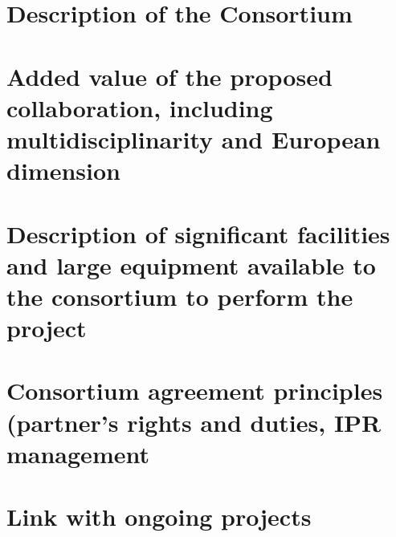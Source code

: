 \documentclass[11pt,twoside,a4paper]{article}
\begin{document}
\section{Description of the Consortium}
\label{sec:consortium}


%
%

\section{Added value of the proposed collaboration, including multidisciplinarity and European dimension}  
\label{sec:added-value}



\section{Description of significant facilities and large equipment available to the consortium to perform the project} 
\label{sec:equipment}


\section{Consortium agreement principles (partner's rights and duties, IPR management}
\label{sec:ipr}



\section{Link with ongoing projects}
\label{sec:link-with-projects}


\end{document}
